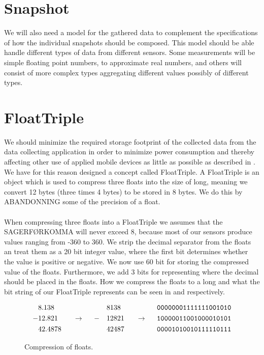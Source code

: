 
\section{Snapshot}
\label{sec:snapshot}

We will also need a model for the gathered data to complement the specifications of how the individual snapshots should be composed. This model should be able handle different types of data from different sensors. Some measurements will be simple floating point numbers, to approximate real numbers, and others will consist of more complex types aggregating different values possibly of different types.  

\section{FloatTriple}
We should minimize the required storage footprint of the collected data from the data collecting application in order to minimize power consumption and thereby affecting other use of applied mobile devices as little as possible as described in . We have for this reason designed a concept called FloatTriple. A FloatTriple is an object which is used to compress three floats into the size of long, meaning we convert 12 bytes (three times 4 bytes) to be stored in 8 bytes. We do this by ABANDONNING some of the precision of a float.
\\\\
When compressing three floats into a FloatTriple we assumes that the SAGERFØRKOMMA will never exceed 8, because most of our sensors produce values ranging from -360 to 360. We strip the decimal separator from the floats an treat them as a 20 bit integer value, where the first bit determines whether the value is positive or negative. We now use 60 bit for storing the compressed value of the floats. Furthermore, we add 3 bits for representing where the decimal should be placed in the floats. How we compress the floats to a long and what the bit string of our FloatTriple represents can be seen in  and  respectively.
\begin{figure}[!htbp]
    \begin{alignat*}{6}
       &8.138   &&                   &&   && 8138  &&                   && \text{\texttt{00000001111111001010}} \\
      -&12.821  && ~~ \rightarrow ~~ && - && 12821 && ~~ \rightarrow ~~ && \text{\texttt{10000011001000010101}} \\
       &42.4878 &&                   &&   && 42487 &&                   && \text{\texttt{00001010010111110111}} 
    \end{alignat*}
    \caption{Compression of floats.}
    \label{fig:float_triple_convert}
\end{figure}

